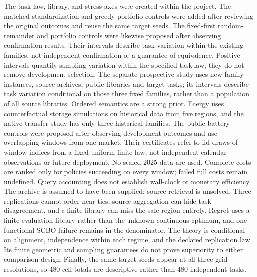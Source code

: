 The task law, library, and stress axes were created within the project.
The matched standardization and greedy-portfolio controls were added after
reviewing the original outcomes and reuse the same target seeds.  The fixed-first random-remainder and portfolio controls were likewise
proposed after observing confirmation results.  Their intervals describe
task variation within the existing families, not independent confirmation
or a guarantee of equivalence.  Positive intervals quantify sampling variation within the specified task law;
they do not remove development selection.  The separate prospective study
uses new family instances, source archives, public libraries and target tasks;
its intervals describe task variation conditional on those three fixed
families, rather than a population of all source libraries.
Ordered semantics are a strong prior.  Energy uses counterfactual storage
simulations on historical data from five regions, and the native transfer
study has only three historical families.
The public-battery controls were proposed after observing development
outcomes and use overlapping windows from one market.  Their certificates
refer to iid draws of window indices from a fixed uniform finite law, not
independent calendar observations or future deployment.  No sealed 2025
data are used.  Complete costs are ranked only for policies succeeding on
every window; failed full costs remain undefined.  Query accounting does
not establish wall-clock or monetary efficiency.
The archive is assumed to have been supplied; source retrieval is unsolved.
Three replications cannot order near ties, source aggregation can hide task
disagreement, and a finite library can miss the safe region entirely.  Regret
uses a finite evaluation library rather than the unknown continuous optimum,
and one functional-SCBO failure remains in the denominator.  The theory is
conditional on alignment, independence within each regime, and the declared
replication law.  Its finite geometric and sampling guarantees do not prove
superiority to either comparison design.  Finally, the same target seeds appear at all three grid
resolutions, so 480-cell totals are descriptive rather than 480 independent
tasks.
